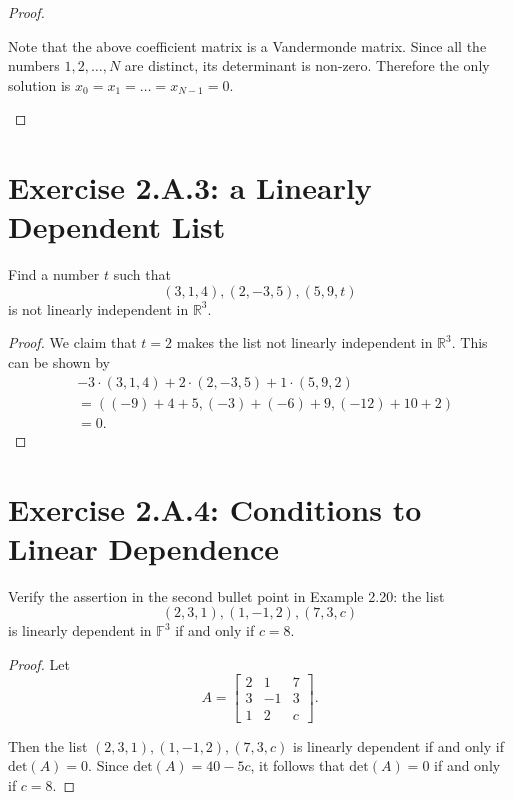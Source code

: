 \begin{proof}
\begin{enumerate}[label=(\alph*)]
Note that the above coefficient matrix is a Vandermonde matrix. Since all the numbers $1, 2, \dots, N$ are distinct, its determinant is non-zero. Therefore the only solution is $x_0=x_1=\dots=x_{N-1}=0$.
\end{enumerate}
\end{proof}

\section{Exercise 2.A.3: a Linearly Dependent List}
Find a number $t$ such that
\[
(3,1,4),(2,-3,5),(5,9,t)
\]
is not linearly independent in $\mathbb{R}^3$.
\begin{proof}
We claim that $t=2$ makes the list not linearly independent in $\mathbb{R}^3$. This can be shown by
\begin{equation*}
\begin{split}
&-3\cdot (3,1,4)+2\cdot (2,-3,5)+1\cdot (5,9,2)\\
&=((-9)+4+5,(-3)+(-6)+9,(-12)+10+2)\\
&=0.
\end{split}
\end{equation*}
\end{proof}

\section{Exercise 2.A.4: Conditions to Linear Dependence}
Verify the assertion in the second bullet point in Example 2.20: the list \[(2,3,1),(1,-1,2),(7,3,c)\] is linearly dependent in $\mathbb{F}^3$ if and only if $c=8$.
\begin{proof}
Let \[
A=\begin{bmatrix}
2&1&7\\
3&-1&3\\
1&2&c
\end{bmatrix}.
\]

Then the list $(2,3,1),(1,-1,2),(7,3,c)$ is linearly dependent if and only if $\text{det}(A)=0$. Since $\text{det}(A)=40-5c$, it follows that $\text{det}(A)=0$ if and only if $c=8$.
\end{proof}

